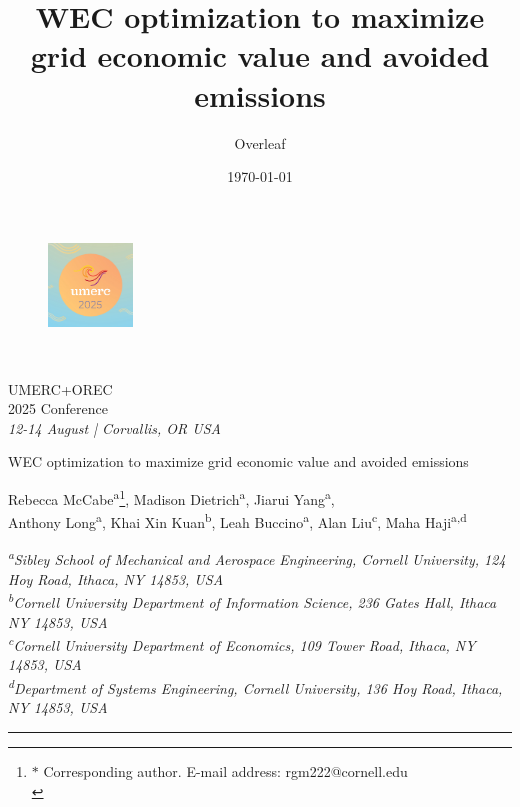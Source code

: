 \documentclass[10pt,twoside]{article}
\title{WEC optimization to maximize grid economic value and avoided emissions}
\author{Overleaf}
\date{\today}
\newif\ifplaceholder
\let\originalincludegraphics\includegraphics
\renewcommand{\includegraphics}[2][]{%
  \ifplaceholder
    \begin{tikzpicture}
      \node[anchor=south west, inner sep=0] (img) at (0,0) {\originalincludegraphics[#1]{#2}};
      \node at ($(img.south east)!0.5!(img.north west)$)
        [fill=white,opacity=0.8,text=red,font=\huge] {Placeholder};
    \end{tikzpicture}
    \vspace{-\baselineskip}
  \else
    \originalincludegraphics[#1]{#2}%
  \fi
  \placeholderfalse %
}
\begin{document}
\thispagestyle{empty} 

\begin{center}
    \begin{figure}[h]
        \centering
        \includegraphics[width = 0.2\textwidth]{./logo.jpg} \\
    \end{figure}
    \vspace{-\baselineskip}
    \huge
    UMERC+OREC \\
    2025 Conference \\
    \vspace{.5\baselineskip}
    \large
    \textit{12-14 August | Corvallis, OR USA} \\
    \vspace{1\baselineskip}
       
    \Large
    WEC optimization to maximize grid economic value and avoided emissions
    \vspace{.5\baselineskip}
    
    \large
    Rebecca McCabe\textsuperscript{a}\footnote{$\ast$ Corresponding author. E-mail address:  rgm222@cornell.edu \\ },
    Madison Dietrich\textsuperscript{a},
    Jiarui Yang\textsuperscript{a}, \\
    Anthony Long\textsuperscript{a},
    Khai Xin Kuan\textsuperscript{b},
    Leah Buccino\textsuperscript{a},
    Alan Liu\textsuperscript{c},
    Maha Haji\textsuperscript{a,d}
    
    
    \small
    \begin{center}
        \textit{\textsuperscript{a}Sibley School of Mechanical and Aerospace Engineering, Cornell University, 124 Hoy Road, Ithaca, NY 14853, USA} \\
        \textit{\textsuperscript{b}Cornell University Department of Information Science, 236 Gates Hall, Ithaca NY 14853, USA} \\
        \textit{\textsuperscript{c}Cornell University Department of Economics, 109 Tower Road, Ithaca, NY 14853, USA} \\
        \textit{\textsuperscript{d}Department of Systems Engineering, Cornell University, 136 Hoy Road, Ithaca, NY 14853, USA}
    \end{center}
    \normalsize
\end{center}         
\vspace{-\baselineskip}\noindent\rule{\textwidth}{0.4pt}\vspace{-\baselineskip}
\end{document}
